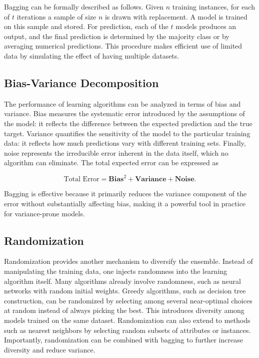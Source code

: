 Bagging can be formally described as follows. Given $n$ training instances, for each of $t$ iterations a sample of size $n$ is drawn with replacement. A model is trained on this sample and stored. For prediction, each of the $t$ models produces an output, and the final prediction is determined by the majority class or by averaging numerical predictions. This procedure makes efficient use of limited data by simulating the effect of having multiple datasets.

\subsection{Bias-Variance Decomposition}

The performance of learning algorithms can be analyzed in terms of bias and variance. Bias measures the systematic error introduced by the assumptions of the model: it reflects the difference between the expected prediction and the true target. Variance quantifies the sensitivity of the model to the particular training data: it reflects how much predictions vary with different training sets. Finally, noise represents the irreducible error inherent in the data itself, which no algorithm can eliminate. The total expected error can be expressed as

\begin{equation}
\text{Total Error} = \textbf{Bias}^2 + \textbf{Variance} + \textbf{Noise}.
\end{equation}

Bagging is effective because it primarily reduces the variance component of the error without substantially affecting bias, making it a powerful tool in practice for variance-prone models.

\subsection{Randomization}

Randomization provides another mechanism to diversify the ensemble. Instead of manipulating the training data, one injects randomness into the learning algorithm itself. Many algorithms already involve randomness, such as neural networks with random initial weights. Greedy algorithms, such as decision tree construction, can be randomized by selecting among several near-optimal choices at random instead of always picking the best. This introduces diversity among models trained on the same dataset. Randomization can also extend to methods such as nearest neighbors by selecting random subsets of attributes or instances. Importantly, randomization can be combined with bagging to further increase diversity and reduce variance.

